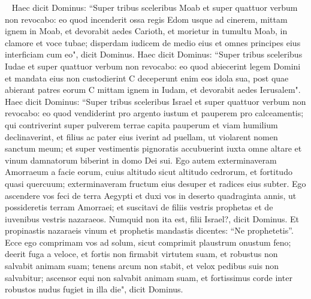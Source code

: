 \begin{biblechapter}   
\verse Haec dicit Dominus: “Super tribus sceleribus Moab et super quattuor verbum non revocabo: eo quod incenderit ossa regis Edom usque ad cinerem, 
\verse mittam ignem in Moab, et devorabit aedes Carioth, et morietur in tumultu Moab, in clamore et voce tubae; 
\verse disperdam iudicem de medio eius et omnes principes eius interficiam cum eo", dicit Dominus. 
\verse Haec dicit Dominus: “Super tribus sceleribus Iudae et super quattuor verbum non revocabo: eo quod abiecerint legem Domini et mandata eius non custodierint C deceperunt enim eos idola sua, post quae abierant patres eorum C 
\verse mittam ignem in Iudam, et devorabit aedes Ierusalem". 
\verse Haec dicit Dominus: “Super tribus sceleribus Israel et super quattuor verbum non revocabo: eo quod vendiderint pro argento iustum et pauperem pro calceamentis; 
\verse qui contriverint super pulverem terrae capita pauperum et viam humilium declinaverint, et filius ac pater eius iverint ad puellam, ut violarent nomen sanctum meum; 
\verse et super vestimentis pignoratis accubuerint iuxta omne altare et vinum damnatorum biberint in domo Dei sui. 
\verse Ego autem exterminaveram Amorraeum a facie eorum, cuius altitudo sicut altitudo cedrorum, et fortitudo quasi quercuum; exterminaveram fructum eius desuper et radices eius subter. 
\verse Ego ascendere vos feci de terra Aegypti et duxi vos in deserto quadraginta annis, ut possideretis terram Amorraei; 
\verse et suscitavi de filiis vestris prophetas et de iuvenibus vestris nazaraeos. Numquid non ita est, filii Israel?, dicit Dominus. 
\verse Et propinastis nazaraeis vinum et prophetis mandastis dicentes: “Ne prophetetis”. 
\verse Ecce ego comprimam vos ad solum, sicut comprimit plaustrum onustum feno; 
\verse deerit fuga a veloce, et fortis non firmabit virtutem suam, et robustus non salvabit animam suam; 
\verse tenens arcum non stabit, et velox pedibus suis non salvabitur; ascensor equi non salvabit animam suam, 
\verse et fortissimus corde inter robustos nudus fugiet in illa die", dicit Dominus. 
\end{biblechapter}

